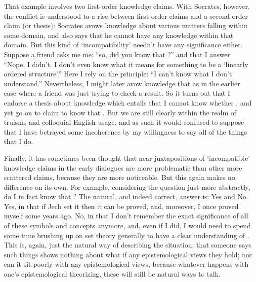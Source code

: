 \documentclass[11pt,letterpaper,oneside]{amsart} %
\begin{document}

That example involves two first-order knowledge claims. With Socrates, however, the conflict is understood to a rise between first-order claims and a second-order claim (or thesis): Socrates avows knowledge about various matters falling within some domain, and also says that he cannot have any knowledge within that domain. But this kind of `incompatibility' needn't have any significance either. Suppose a friend asks me me: ``so, did you know that ?'' and that I answer ``Nope, I didn't. I don't even know what it means for something to be a `linearly ordered structure'.'' Here I rely on the principle: ``I can't know what I don't understand.'' Nevertheless, I might later avow knowledge that  as in the earlier case where a friend was just trying to check a result. So it turns out that I endorse a thesis about knowledge which entails that I cannot know whether , and yet go on to claim to know that . But we are still clearly within the realm of truisms and colloquial English usage, and as such it would confused to suppose that I have betrayed some incoherence by my willingness to say all of the things that I do.

Finally, it has sometimes been thought that near juxtapositions of `incompatible' knowledge claims in the early dialogues are more problematic than other more scattered claims, because they are more noticeable. But this again makes no difference on its own. For example, considering the question just more abstractly, do I in fact know that ? The natural, and indeed correct, answer is: Yes and No. Yes, in that if Jech set it then it can be proved, and, moreover, I once proved  myself some years ago. No, in that I don't remember the exact significance of all of these symbols and concepts anymore, and, even if I did, I would need to spend some time brushing up on set theory generally to have a clear understanding of . This is, again, just the natural way of describing the situation; that someone says such things shows nothing about what if any epistemological views they hold; nor can it sit poorly with any epistemological views, because whatever happens with one's epistemological theorizing, these will still be natural ways to talk.%
\end{document}
